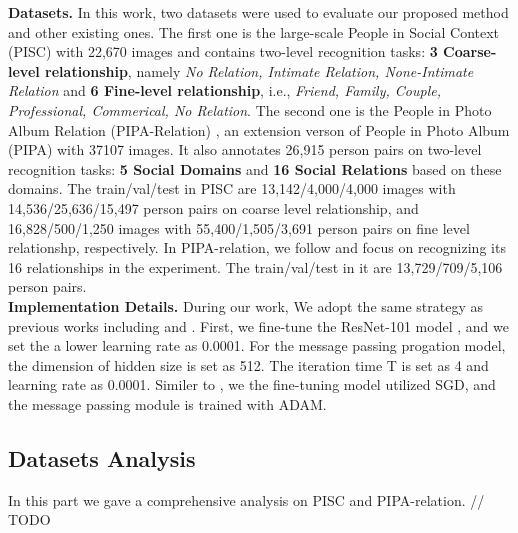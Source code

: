 \documentclass{article}
\begin{document}
{\bf Datasets.} In this work, two datasets were used to evaluate our proposed method and other existing ones. The first one is the large-scale People in Social Context (PISC) \cite{DBLP:conf/iccv/LiWZK17} with 22,670 images and contains two-level recognition tasks: {\bf 3 Coarse-level relationship}, namely {\it No Relation, Intimate Relation, None-Intimate Relation} and {\bf 6 Fine-level relationship}, i.e., {\it Friend, Family, Couple, Professional, Commerical, No Relation}. The second one is the People in Photo Album Relation (PIPA-Relation) \cite{DBLP:conf/cvpr/SunSF17}, an extension verson of People in Photo Album (PIPA) \cite{DBLP:conf/cvpr/ZhangPTFB15} with 37107 images. It also annotates 26,915 person pairs on two-level recognition tasks: {\bf 5 Social Domains} and {\bf 16 Social Relations} based on these domains. The train/val/test in PISC are 13,142/4,000/4,000 images with 14,536/25,636/15,497 person pairs on coarse level relationship, and 16,828/500/1,250 images with 55,400/1,505/3,691 person pairs on fine level relationshp, respectively. In PIPA-relation, we follow \cite{DBLP:conf/ijcai/WangCRYCL18} and focus on recognizing its 16 relationships in the experiment. The train/val/test in it are 13,729/709/5,106 person pairs. \\
{\bf Implementation Details.} During our work, We adopt the same strategy as previous works including \cite{DBLP:conf/iccv/LiWZK17} and \cite{DBLP:conf/ijcai/WangCRYCL18}. First, we fine-tune the ResNet-101 model \cite{DBLP:conf/cvpr/HeZRS16} , and we set the a lower learning rate as 0.0001. For the message passing progation model, the dimension of hidden size is set as 512. The iteration time T is set as 4 and learning rate as 0.0001. Similer to \cite{DBLP:conf/ijcai/WangCRYCL18}, we the fine-tuning model utilized SGD, and the message passing module is trained with ADAM.

\subsection{Datasets Analysis}

In this part we gave a comprehensive analysis on PISC and PIPA-relation.  // TODO
\end{document}

